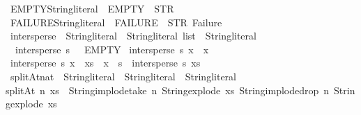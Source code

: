 \begin{isabellebody}
%
\isamarkuptrue%
%
\endisatagdocument
{\isafolddocument}%
%
\isadelimdocument
%
\endisadelimdocument
{}\isamarkupfalse%
\ EMPTY{\isacharcolon}{\kern0pt}{\isacharcolon}{\kern0pt}{\isachardoublequoteopen}String{\isachardot}{\kern0pt}literal{\isachardoublequoteclose}\ \ {\isachardoublequoteopen}EMPTY\ {\isacharequal}{\kern0pt}\ STR\ {\isacharprime}{\kern0pt}{\isacharprime}{\kern0pt}{\isacharprime}{\kern0pt}{\isacharprime}{\kern0pt}{\isachardoublequoteclose}\isanewline
\isanewline
{}\isamarkupfalse%
\ FAILURE{\isacharcolon}{\kern0pt}{\isacharcolon}{\kern0pt}{\isachardoublequoteopen}String{\isachardot}{\kern0pt}literal{\isachardoublequoteclose}\ \ {\isachardoublequoteopen}FAILURE\ {\isacharequal}{\kern0pt}\ STR\ {\isacharprime}{\kern0pt}{\isacharprime}{\kern0pt}Failure{\isacharprime}{\kern0pt}{\isacharprime}{\kern0pt}{\isachardoublequoteclose}\isanewline
\isanewline
{}\isamarkupfalse%
\ intersperse\ {\isacharcolon}{\kern0pt}{\isacharcolon}{\kern0pt}\ {\isachardoublequoteopen}String{\isachardot}{\kern0pt}literal\ {\isasymRightarrow}\ String{\isachardot}{\kern0pt}literal\ list\ {\isasymRightarrow}\ String{\isachardot}{\kern0pt}literal{\isachardoublequoteclose}\ \isanewline
\ \ {\isachardoublequoteopen}intersperse\ s\ {\isacharbrackleft}{\kern0pt}{\isacharbrackright}{\kern0pt}\ {\isacharequal}{\kern0pt}\ EMPTY{\isachardoublequoteclose}\isanewline
{\isacharbar}{\kern0pt}\ {\isachardoublequoteopen}intersperse\ s\ {\isacharbrackleft}{\kern0pt}x{\isacharbrackright}{\kern0pt}\ {\isacharequal}{\kern0pt}\ x{\isachardoublequoteclose}\isanewline
{\isacharbar}{\kern0pt}\ {\isachardoublequoteopen}intersperse\ s\ {\isacharparenleft}{\kern0pt}x\ {\isacharhash}{\kern0pt}\ xs{\isacharparenright}{\kern0pt}\ {\isacharequal}{\kern0pt}\ x\ {\isacharplus}{\kern0pt}\ s\ {\isacharplus}{\kern0pt}\ intersperse\ s\ xs{\isachardoublequoteclose}\isanewline
\isanewline
{}\isamarkupfalse%
\ splitAt{\isacharcolon}{\kern0pt}{\isacharcolon}{\kern0pt}{\isachardoublequoteopen}nat\ {\isasymRightarrow}\ String{\isachardot}{\kern0pt}literal\ {\isasymRightarrow}\ String{\isachardot}{\kern0pt}literal\ {\isasymtimes}\ String{\isachardot}{\kern0pt}literal{\isachardoublequoteclose}\ \isanewline
{\isachardoublequoteopen}splitAt\ n\ xs\ {\isacharequal}{\kern0pt}\ {\isacharparenleft}{\kern0pt}String{\isachardot}{\kern0pt}implode{\isacharparenleft}{\kern0pt}take\ n\ {\isacharparenleft}{\kern0pt}String{\isachardot}{\kern0pt}explode\ xs{\isacharparenright}{\kern0pt}{\isacharparenright}{\kern0pt}{\isacharcomma}{\kern0pt}\ String{\isachardot}{\kern0pt}implode{\isacharparenleft}{\kern0pt}drop\ n\ {\isacharparenleft}{\kern0pt}String{\isachardot}{\kern0pt}explode\ xs{\isacharparenright}{\kern0pt}{\isacharparenright}{\kern0pt}{\isacharparenright}{\kern0pt}{\isachardoublequoteclose}\isanewline

\end{isabellebody}
